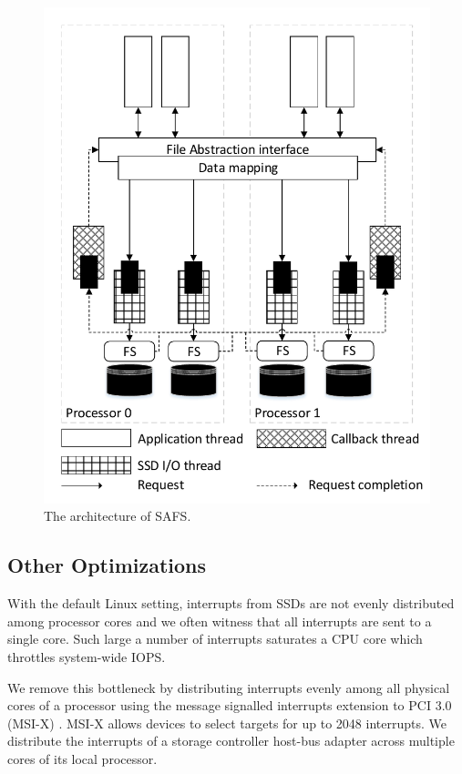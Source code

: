 \begin{figure}[t]
\centering
\includegraphics[scale=0.6]{figs/SAFS/SSD-array.pdf}
\vspace{-5pt}
\caption{The architecture of SAFS.}
\vspace{-5pt}
\label{SSD_VFS}
\end{figure}

\subsection{Other Optimizations}

With the default Linux setting, interrupts from SSDs are not evenly distributed
among processor cores and we often witness that all interrupts are sent to a single core. 
Such large a number of interrupts saturates a CPU core which throttles system-wide
IOPS.

We remove this bottleneck by distributing interrupts evenly among all 
physical cores of a processor using the message signalled interrupts extension to 
PCI 3.0 (MSI-X) \cite{msix}.  MSI-X allows devices to select targets for up 
to 2048 interrupts.  We distribute the interrupts of a storage controller 
host-bus adapter across multiple cores of its local processor.

